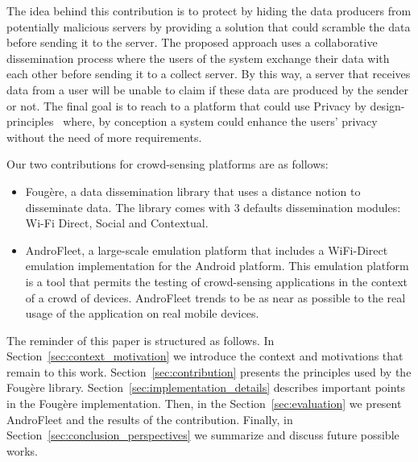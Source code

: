 
The idea behind this contribution is to protect by hiding the data producers from potentially malicious servers by providing a solution that could scramble the data before sending it to the server.
The proposed approach uses a collaborative dissemination process where the users of the system exchange their data with each other before sending it to a collect server.
By this way, a server that receives data from a user will be unable to claim if these data are produced by the sender or not.
The final goal is to reach to a platform that could use Privacy by design-principles~\cite{langheinrich2001privacy} where, by conception a system could enhance the users' privacy without the need of more requirements.


Our two contributions for crowd-sensing platforms are as follows:
\begin{itemize}
	\item Foug\`ere, a data dissemination library that uses a distance notion to disseminate data.
	The library comes with 3 defaults dissemination modules: Wi-Fi Direct, Social and Contextual.
	\item AndroFleet, a large-scale emulation platform that includes a WiFi-Direct emulation implementation for the Android platform. 
	This emulation platform is a tool that permits the testing of crowd-sensing applications in the context of a crowd of devices. 
	AndroFleet trends to be as near as possible to the real usage of the application on real mobile devices.
\end{itemize}


The reminder of this paper is structured as follows.
In Section~\ref{sec:context_motivation} we introduce the context and motivations that remain to this work.
Section~\ref{sec:contribution} presents the principles used by the Foug\`ere library.
Section~\ref{sec:implementation_details} describes important points in the Foug\`ere implementation.
Then, in the Section~\ref{sec:evaluation} we present AndroFleet and the results of the contribution.
Finally, in Section~\ref{sec:conclusion_perspectives} we summarize and discuss future possible works.

